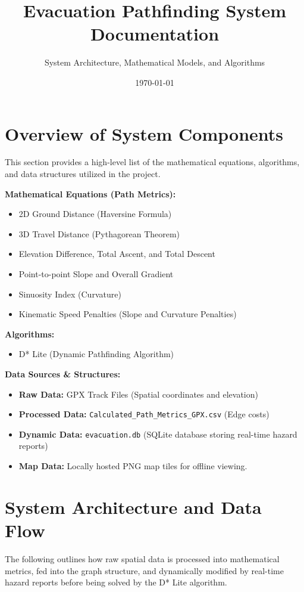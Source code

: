 \documentclass[12pt, a4paper]{article}
\title{Evacuation Pathfinding System Documentation}
\author{System Architecture, Mathematical Models, and Algorithms}
\date{\today}
\begin{document}
\maketitle
\tableofcontents
\newpage

\section{Overview of System Components}
This section provides a high-level list of the mathematical equations, algorithms, and data structures utilized in the project.

\textbf{Mathematical Equations (Path Metrics):}
\begin{itemize}
    \item 2D Ground Distance (Haversine Formula)
    \item 3D Travel Distance (Pythagorean Theorem)
    \item Elevation Difference, Total Ascent, and Total Descent
    \item Point-to-point Slope and Overall Gradient
    \item Sinuosity Index (Curvature)
    \item Kinematic Speed Penalties (Slope and Curvature Penalties)
\end{itemize}

\textbf{Algorithms:}
\begin{itemize}
    \item D* Lite (Dynamic Pathfinding Algorithm)
\end{itemize}

\textbf{Data Sources \& Structures:}
\begin{itemize}
    \item \textbf{Raw Data:} GPX Track Files (Spatial coordinates and elevation)
    \item \textbf{Processed Data:} \texttt{Calculated\_Path\_Metrics\_GPX.csv} (Edge costs)
    \item \textbf{Dynamic Data:} \texttt{evacuation.db} (SQLite database storing real-time hazard reports)
    \item \textbf{Map Data:} Locally hosted PNG map tiles for offline viewing.
\end{itemize}


\section{System Architecture and Data Flow}
The following outlines how raw spatial data is processed into mathematical metrics, fed into the graph structure, and dynamically modified by real-time hazard reports before being solved by the D* Lite algorithm.
\end{document}
